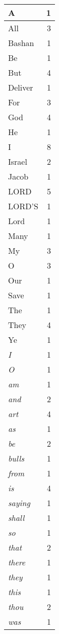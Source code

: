 \begin{center}
\begin{longtable}{l|r}
\hline \hline
\endlastfoot
A & 1 \\ \hline
All & 3 \\ \hline
Bashan & 1 \\ \hline
Be & 1 \\ \hline
But & 4 \\ \hline
Deliver & 1 \\ \hline
For & 3 \\ \hline
God & 4 \\ \hline
He & 1 \\ \hline
I & 8 \\ \hline
Israel & 2 \\ \hline
Jacob & 1 \\ \hline
LORD & 5 \\ \hline
LORD'S & 1 \\ \hline
Lord & 1 \\ \hline
Many & 1 \\ \hline
My & 3 \\ \hline
O & 3 \\ \hline
Our & 1 \\ \hline
Save & 1 \\ \hline
The & 1 \\ \hline
They & 4 \\ \hline
Ye & 1 \\ \hline
\emph{I} & 1 \\ \hline
\emph{O} & 1 \\ \hline
\emph{am} & 1 \\ \hline
\emph{and} & 2 \\ \hline
\emph{art} & 4 \\ \hline
\emph{as} & 1 \\ \hline
\emph{be} & 2 \\ \hline
\emph{bulls} & 1 \\ \hline
\emph{from} & 1 \\ \hline
\emph{is} & 4 \\ \hline
\emph{saying} & 1 \\ \hline
\emph{shall} & 1 \\ \hline
\emph{so} & 1 \\ \hline
\emph{that} & 2 \\ \hline
\emph{there} & 1 \\ \hline
\emph{they} & 1 \\ \hline
\emph{this} & 1 \\ \hline
\emph{thou} & 2 \\ \hline
\emph{was} & 1 \\ \hline

\end{longtable}
\end{center}
